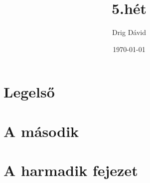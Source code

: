 \documentclass{book}
\title{5.hét}
\author{Drig Dávid}
\date{\today}
\begin{document}
\frontmatter

\maketitle
\tableofcontents

\mainmatter

\chapter{Legelső}
\hulipsum[3]
\cite{abrharber03}
\cite{bujfaz}
\hulipsum[1]
\cite{g4gbin}
\chapter{A második}
\hulipsum
\chapter{A harmadik fejezet}
\hulipsum[2]
\cite{knuth84}
\cite{lamport94}
\cite{tomacs21}

\backmatter



\end{document}
